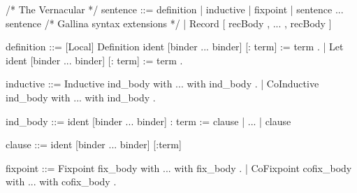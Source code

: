 \documentclass[a4paper,11pt]{article}
\begin{document}
\begin{grm}
				
/* The Vernacular */
sentence ::= definition
           | inductive
           | fixpoint
           | sentence ... sentence
           /* Gallina syntax extensions */
           | Record [ recBody , ... , recBody ]
					  	   
definition ::= [Local] Definition ident [binder ... binder] [: term] := term .		   
             | Let ident [binder ... binder] [: term] := term .

inductive ::= Inductive ind_body with ... with ind_body .
            | CoInductive ind_body with ... with ind_body .
			  
ind_body ::= ident  [binder ... binder] : term := clause | ... | clause

clause ::= ident [binder ... binder] [:term]
				
						  
fixpoint ::= Fixpoint fix_body with ... with fix_body .
           | CoFixpoint cofix_body with ... with cofix_body .
\end{grm}

{}

\end{document}
